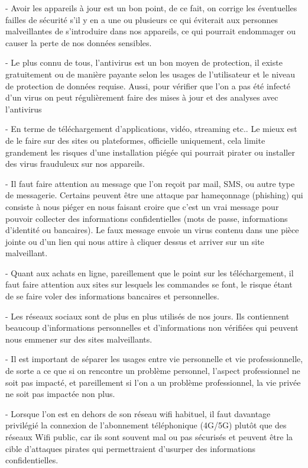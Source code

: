 \documentclass[a4paper,11pt]{article}
\begin{document}
  - Avoir les appareils à jour est un bon point, de ce fait, on corrige les éventuelles failles de sécurité s’il y en a une ou plusieurs ce qui éviterait aux personnes malveillantes de s’introduire dans nos appareils, ce qui pourrait endommager ou causer la perte de nos données sensibles.

  - Le plus connu de tous, l’antivirus est un bon moyen de protection, il existe gratuitement ou de manière payante selon les usages de l’utilisateur et le niveau de protection de données requise. Aussi, pour vérifier que l’on a pas été infecté d’un virus on peut régulièrement faire des mises à jour et des analyses avec l’antivirus


  - En terme de téléchargement d’applications, vidéo, streaming etc.. Le mieux est de le faire sur des sites ou plateformes, officielle uniquement, cela limite grandement les risques d’une installation piégée qui pourrait pirater ou installer des virus frauduleux sur nos appareils.

  - Il faut faire attention au message que l’on reçoit par mail, SMS, ou autre type de messagerie. Certains peuvent être une attaque par hameçonnage (phishing) qui consiste à nous piéger en nous faisant croire que c’est un vrai message pour pouvoir collecter des informations confidentielles (mots de passe, informations d’identité ou bancaires). Le faux message envoie un virus contenu dans une pièce jointe ou d’un lien qui nous attire à cliquer dessus et arriver sur un site malveillant.

  - Quant aux achats en ligne, pareillement que le point sur les téléchargement, il faut faire attention aux sites sur lesquels les commandes se font, le risque étant de se faire voler des informations bancaires et personnelles.

  - Les réseaux sociaux sont de plus en plus utilisés de nos jours. Ils contiennent beaucoup d’informations personnelles et d’informations non vérifiées qui peuvent nous emmener sur des sites malveillants.

  - Il est important de séparer les usages entre vie personnelle et vie professionnelle, de sorte a ce que si on rencontre un problème personnel, l’aspect professionnel ne soit pas impacté, et pareillement si l’on a un problème professionnel, la vie privée ne soit pas impactée non plus. 

  - Lorsque l’on est en dehors de son réseau wifi habituel, il faut davantage privilégié la connexion de l’abonnement téléphonique (4G/5G) plutôt que des réseaux Wifi public, car ils sont souvent mal ou pas sécurisés et peuvent être la cible d’attaques pirates qui permettraient d’usurper des informations confidentielles.
\end{document}

